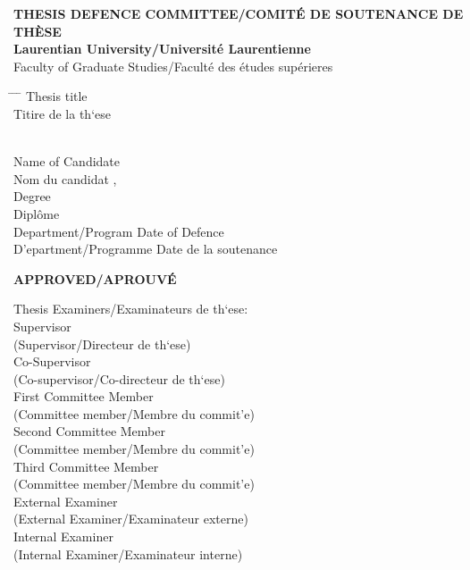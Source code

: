 \begin{center}
    \textbf{THESIS DEFENCE COMMITTEE/COMIT\'E DE SOUTENANCE DE TH\`ESE} \\
    \textbf{Laurentian University/Universit\'e Laurentienne} \\
    Faculty of Graduate Studies/Facult\'e des \'etudes sup\'erieres
\end{center}
\footnotesize
\begin{tabbing}
    \hspace{0.25\textwidth} \= \hspace{0.33\textwidth} \= \hspace{0.22\textwidth} \= \hspace{0.2\textwidth} \kill
    Thesis title \\
    Titire de la th\a`ese \> \begin{minipage}[t]{0.75\textwidth} \thetitle \end{minipage} \\[1.0em]
    Name of Candidate \\
    Nom du candidat \> \surname , \givenname \\[1.0em]
    Degree \\
    Dipl\^ome \> \programdegree \\[1.0em]
    Department/Program \> \> Date of Defence \\
    D\a'epartment/Programme \> \program \> Date de la soutenance \> \dateofdefence
\end{tabbing}
\vspace{-2.0\parskip}
\begin{center}
    \textbf{APPROVED/APROUV\'E} \\
\end{center}
\vspace{-1.5\parskip}
\begin{minipage}[c]{0.5\textwidth}
    Thesis Examiners/Examinateurs de th\a`ese: \\[1.00em]
    Supervisor \\
    (Supervisor/Directeur de th\a`ese) \\[0.5em]
    Co-Supervisor \\
    (Co-supervisor/Co-directeur de th\a`ese) \\[0.5em]
    First Committee Member \\
    (Committee member/Membre du commit\a'e) \\[1.00em]
    Second Committee Member \\
    (Committee member/Membre du commit\a'e) \\[1.00em]
    Third Committee Member \\
    (Committee member/Membre du commit\a'e) \\[1.00em]
    External Examiner \\
    (External Examiner/Examinateur externe) \\[1.00em]
    Internal Examiner \\
    (Internal Examiner/Examinateur interne) \\
\end{minipage}
